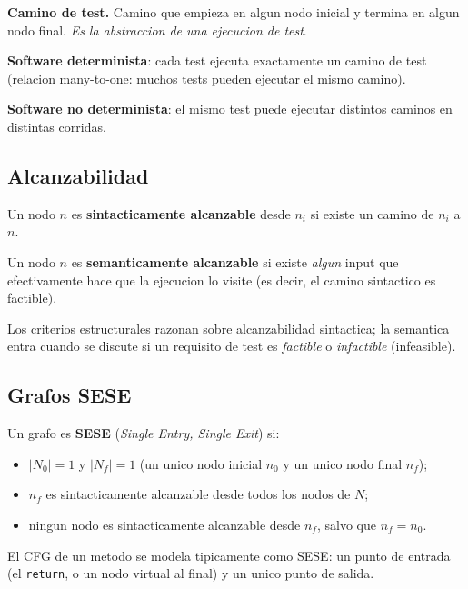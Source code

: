 \documentclass[12pt,a4paper]{article}
\begin{document}
\textbf{Camino de test.} Camino que empieza en algun nodo inicial y termina en algun nodo final.
\emph{Es la abstraccion de una ejecucion de test}.

\begin{ideabox}
\textbf{Software determinista}: cada test ejecuta exactamente un camino de test (relacion
many-to-one: muchos tests pueden ejecutar el mismo camino).

\textbf{Software no determinista}: el mismo test puede ejecutar distintos caminos en distintas
corridas.
\end{ideabox}

\subsection{Alcanzabilidad}

\begin{definicionbox}
Un nodo $n$ es \textbf{sintacticamente alcanzable} desde $n_i$ si existe un camino de $n_i$ a
$n$.

Un nodo $n$ es \textbf{semanticamente alcanzable} si existe \emph{algun} input que efectivamente
hace que la ejecucion lo visite (es decir, el camino sintactico es factible).
\end{definicionbox}

Los criterios estructurales razonan sobre alcanzabilidad sintactica; la semantica entra cuando se
discute si un requisito de test es \emph{factible} o \emph{infactible} (infeasible).

\subsection{Grafos SESE}

\begin{definicionbox}
Un grafo es \textbf{SESE} (\textit{Single Entry, Single Exit}) si:
\begin{itemize}
  \item $|N_0| = 1$ y $|N_f| = 1$ (un unico nodo inicial $n_0$ y un unico nodo final $n_f$);
  \item $n_f$ es sintacticamente alcanzable desde todos los nodos de $N$;
  \item ningun nodo es sintacticamente alcanzable desde $n_f$, salvo que $n_f = n_0$.
\end{itemize}
\end{definicionbox}

El CFG de un metodo se modela tipicamente como SESE: un punto de entrada (el \texttt{return}, o
un nodo virtual al final) y un unico punto de salida.
\end{document}
